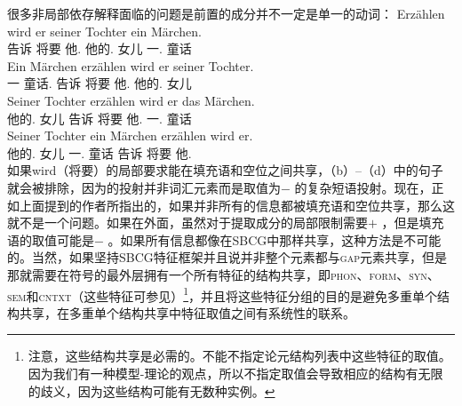 很多非局部依存解释面临的问题是前置的成分并不一定是单一的动词：
\eal
\label{bsp-erzaehlen-wird}
\ex
\gll Erzählen wird er       seiner Tochter ein Märchen.\\
      告诉       将要 他.\nom{} 他的.\dat{} 女儿   一.\acc{}   童话\\
\ex
\gll Ein Märchen        erzählen wird er       seiner Tochter.\\
      一   童话.\acc{}    告诉       将要 他.\nom{} 他的.\dat{}    女儿\\
\ex  
\gll Seiner Tochter        erzählen wird er       das Märchen.\\
      他的.\dat{}    女儿   告诉       将要 他.\nom{} 一.\acc{} 童话\\
\ex  
\gll Seiner Tochter        ein Märchen        erzählen wird er.\\
     他的.\dat{}    女儿 一.\acc{}   童话       告诉      将要 他.\nom\\
\zl
如果wird（将要）的局部要求能在填充语和空位之间共享，（b）--（d）中的句子就会被排除，因为\vfc 的投射并非词汇元素而是取值为\lexc$-$ 的复杂短语投射。现在，正如上面提到的作者所指出的，如果并非所有的信息都被填充语和空位共享，那么这就不是一个问题。如果\lexc 在\localc 外面，虽然对于提取成分的局部限制需要\lexvc $+$ ，但是填充语的取值可能是\lexc$-$ 。如果所有信息都像在SBCG中那样共享，这种方法是不可能的。当然，如果坚持SBCG特征框架并且说并非整个\argstc 元素都与\textsc{gap}元素共享，但是那就需要在符号的最外层拥有一个所有特征的结构共享，即\textsc{phon}、\textsc{form}、\textsc{syn}、\textsc{sem}和\textsc{cntxt}（这些特征可参见\citet[]{Sag2012a}）\footnote{%
 注意，这些结构共享是必需的。不能不指定论元结构列表中这些特征的取值。因为我们有一种模型-理论的观点，所以不指定取值会导致相应的结构有无限的歧义，因为这些结构可能有无数种实例。%
}，并且将这些特征分组的目的是避免多重单个结构共享，在多重单个结构共享中特征取值之间有系统性的联系。
